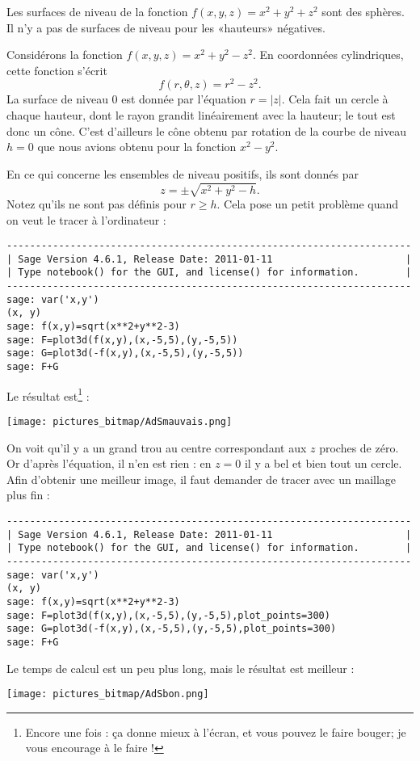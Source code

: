 \begin{example}
	Les surfaces de niveau de la fonction \( f(x,y,z)=x^2+y^2+z^2\) sont des sphères. Il n'y a pas de surfaces de niveau pour les «hauteurs» négatives.
\end{example}

\begin{example}
	Considérons la fonction \( f(x,y,z)=x^2+y^2-z^2\). En coordonnées cylindriques, cette fonction s'écrit
	\begin{equation}
		f(r,\theta,z)=r^2-z^2.
	\end{equation}
	La surface de niveau \( 0\) est donnée par l'équation \( r=| z |\). Cela fait un cercle à chaque hauteur, dont le rayon grandit linéairement avec la hauteur; le tout est donc un cône. C'est d'ailleurs le cône obtenu par rotation de la courbe de niveau \( h=0\) que nous avions obtenu pour la fonction \( x^2-y^2\).

	En ce qui concerne les ensembles de niveau positifs, ils sont donnés par
	\begin{equation}
		z=\pm\sqrt{x^2+y^2-h}.
	\end{equation}
	Notez qu'ils ne sont pas définis pour \( r\geq h\). Cela pose un petit problème quand on veut le tracer à l'ordinateur :
	\begin{verbatim}
----------------------------------------------------------------------
| Sage Version 4.6.1, Release Date: 2011-01-11                       |
| Type notebook() for the GUI, and license() for information.        |
----------------------------------------------------------------------
sage: var('x,y')
(x, y)
sage: f(x,y)=sqrt(x**2+y**2-3)
sage: F=plot3d(f(x,y),(x,-5,5),(y,-5,5))
sage: G=plot3d(-f(x,y),(x,-5,5),(y,-5,5))
sage: F+G
    \end{verbatim}
	Le résultat est\footnote{Encore une fois : ça donne mieux à l'écran, et vous pouvez le faire bouger; je vous encourage à le faire !} :
	\begin{center}
		\texttt{[image: pictures\_bitmap/AdSmauvais.png]}
	\end{center}
	On voit qu'il y a un grand trou au centre correspondant aux \( z\) proches de zéro. Or d'après l'équation, il n'en est rien : en \( z=0\) il y a bel et bien tout un cercle. Afin d'obtenir une meilleur image, il faut demander de tracer avec un maillage plus fin :
	\begin{verbatim}
----------------------------------------------------------------------
| Sage Version 4.6.1, Release Date: 2011-01-11                       |
| Type notebook() for the GUI, and license() for information.        |
----------------------------------------------------------------------
sage: var('x,y')
(x, y)
sage: f(x,y)=sqrt(x**2+y**2-3)
sage: F=plot3d(f(x,y),(x,-5,5),(y,-5,5),plot_points=300)
sage: G=plot3d(-f(x,y),(x,-5,5),(y,-5,5),plot_points=300)
sage: F+G
    \end{verbatim}
	Le temps de calcul est un peu plus long, mais le résultat est meilleur :
	\begin{center}
		\texttt{[image: pictures\_bitmap/AdSbon.png]}
	\end{center}
\end{example}


